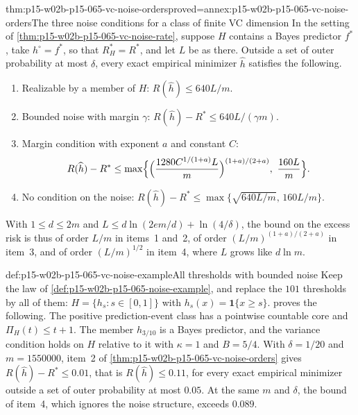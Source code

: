 \begin{hbcorollary}{thm:p15-w02b-p15-065-vc-noise-orders}{proved=annex:p15-w02b-p15-065-vc-noise-orders}{The three noise conditions for a class of finite VC dimension}
In the setting of \cref{thm:p15-w02b-p15-065-vc-noise-rate}, suppose \(H\)
contains a Bayes predictor \(f^{*}\), take \(h^{\circ}=f^{*}\), so that
\(R_H^{*}=R^{*}\), and let \(L\) be as there. Outside a set of outer
probability at most \(\delta\), every exact empirical minimizer
\(\widehat h\) satisfies the following.
\begin{enumerate}
\item Realizable by a member of \(H\): \(R(\widehat h)\leq640L/m\).
\item Bounded noise with margin \(\gamma\):
      \(R(\widehat h)-R^{*}\leq640L/(\gamma m)\).
\item Margin condition with exponent \(a\) and constant \(C\):
      \[
       R(\widehat h)-R^{*}\leq\max\Bigl\{\Bigl(\frac{1280C^{1/(1+a)}L}{m}\Bigr)^{(1+a)/(2+a)},\
       \frac{160L}{m}\Bigr\}.
      \]
\item No condition on the noise:
      \(R(\widehat h)-R^{*}\leq\max\{\sqrt{640L/m},\,160L/m\}\).
\end{enumerate}
With \(1\leq d\leq2m\) and \(L\leq d\ln(2em/d)+\ln(4/\delta)\), the
bound on the excess risk is thus of order \(L/m\) in items~1 and~2, of
order \((L/m)^{(1+a)/(2+a)}\) in item~3, and of order \((L/m)^{1/2}\) in
item~4, where \(L\) grows like \(d\ln m\).
\end{hbcorollary}

\begin{hbexample}{def:p15-w02b-p15-065-vc-noise-example}{All thresholds with bounded noise}
Keep the law of \cref{def:p15-w02b-p15-065-noise-example}, and replace the
\(101\) thresholds by all of them:
\(H=\{h_s:s\in[0,1]\}\) with \(h_s(x)=\mathbf1\{x\geq s\}\).
 proves the following. The
positive prediction-event class has a pointwise countable core and
\(\Pi_H(t)\leq t+1\). The member \(h_{3/10}\) is a Bayes predictor, and the
variance condition holds on \(H\) relative to it with \(\kappa=1\) and
\(B=5/4\). With \(\delta=1/20\) and \(m=1550000\), item~2 of
\cref{thm:p15-w02b-p15-065-vc-noise-orders} gives
\(R(\widehat h)-R^{*}\leq0.01\), that is \(R(\widehat h)\leq0.11\), for
every exact empirical minimizer outside a set of outer probability at most
\(0.05\). At the same \(m\) and \(\delta\), the bound of item~4, which
ignores the noise structure, exceeds \(0.089\).
\end{hbexample}


